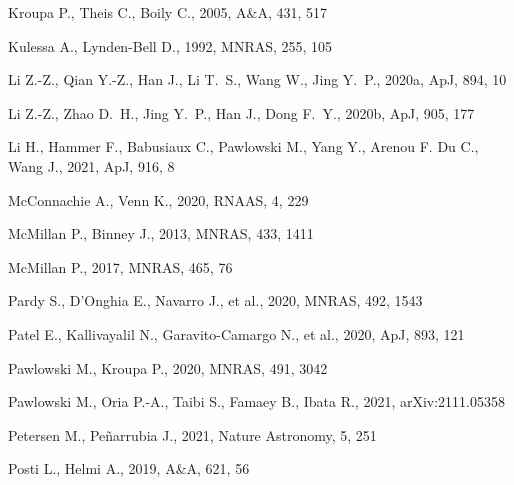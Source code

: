 \documentclass[usenatbib,fleqn]{mnras}
\begin{document}
\begin{thebibliography}{}
Kroupa P., Theis C., Boily C., 2005, A\&A, 431, 517

Kulessa A., Lynden-Bell D., 1992, MNRAS, 255, 105

Li Z.-Z., Qian Y.-Z., Han J., Li T.~S., Wang W., Jing Y.~P., 2020a, ApJ, 894, 10

Li Z.-Z., Zhao D.~H., Jing Y.~P., Han J., Dong F.~Y., 2020b, ApJ, 905, 177

Li H., Hammer F., Babusiaux C., Pawlowski M., Yang Y., Arenou F. Du C., Wang J., 2021, ApJ, 916, 8

McConnachie A., Venn K., 2020, RNAAS, 4, 229

McMillan P., Binney J., 2013, MNRAS, 433, 1411

McMillan P., 2017, MNRAS, 465, 76

Pardy S., D'Onghia E., Navarro J., et al., 2020, MNRAS, 492, 1543


Patel E., Kallivayalil N., Garavito-Camargo N., et al., 2020, ApJ, 893, 121

Pawlowski M., Kroupa P., 2020, MNRAS, 491, 3042

Pawlowski M., Oria P.-A., Taibi S., Famaey B., Ibata R., 2021, arXiv:2111.05358

Petersen M., Pe\~narrubia J., 2021, Nature Astronomy, 5, 251

Posti L., Helmi A., 2019, A\&A, 621, 56


\end{thebibliography}
\end{document}

